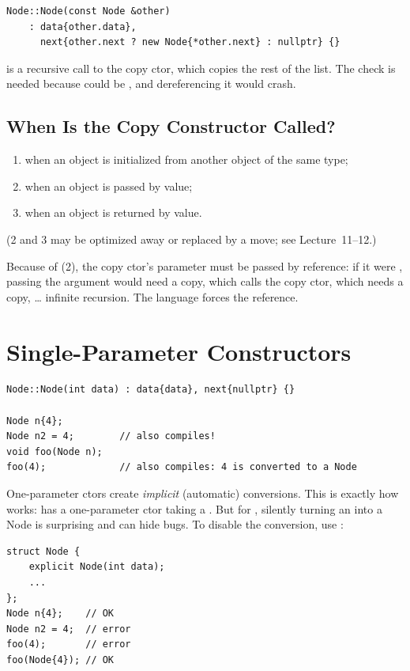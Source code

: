 \begin{lstlisting}[style=cpp]
Node::Node(const Node &other)
    : data{other.data},
      next{other.next ? new Node{*other.next} : nullptr} {}
\end{lstlisting}
 is a recursive call to the copy ctor, which
copies the rest of the list. The check is needed because  could
be , and dereferencing it would crash.

\subsection{When Is the Copy Constructor Called?}
\begin{enumerate}
  \item when an object is initialized from another object of the same type;
  \item when an object is passed by value;
  \item when an object is returned by value.
\end{enumerate}
(2 and 3 may be optimized away or replaced by a move; see Lecture~11--12.)

\begin{important}
Because of (2), the copy ctor's parameter must be passed by reference: if it were
, passing the argument would need a copy, which calls the
copy ctor, which needs a copy, \dots{} infinite recursion. The language forces
the reference.
\end{important}

\section{Single-Parameter Constructors}
\begin{lstlisting}[style=cpp]
Node::Node(int data) : data{data}, next{nullptr} {}

Node n{4};
Node n2 = 4;        // also compiles!
void foo(Node n);
foo(4);             // also compiles: 4 is converted to a Node
\end{lstlisting}
One-parameter ctors create \emph{implicit} (automatic) conversions. This is
exactly how  works:  has a
one-parameter ctor taking a . But for , silently
turning an  into a Node is surprising and can hide bugs. To disable
the conversion, use :
\begin{lstlisting}[style=cpp]
struct Node {
    explicit Node(int data);
    ...
};
Node n{4};    // OK
Node n2 = 4;  // error
foo(4);       // error
foo(Node{4}); // OK
\end{lstlisting}

